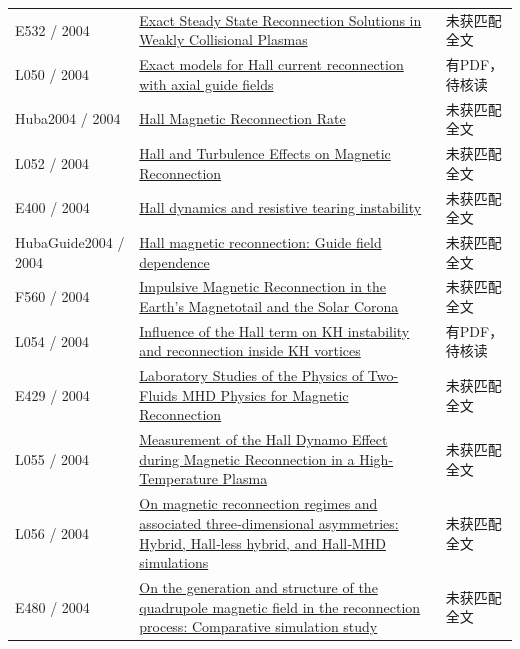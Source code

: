 \documentclass[UTF8,a4paper,11pt,openany,fontset=fandol]{ctexbook}
\begin{document}
\begin{longtable}{P{24mm}P{97mm}P{27mm}}
E532 / 2004 & \href{https://doi.org/10.1086/425646}{Exact Steady State Reconnection Solutions in Weakly Collisional Plasmas} & 未获匹配全文\\

L050 / 2004 & \href{https://doi.org/10.1063/1.1826094}{Exact models for Hall current reconnection with axial guide fields} & 有PDF，待核读\\

Huba2004 / 2004 & \href{https://doi.org/10.1103/physrevlett.93.175003}{Hall Magnetic Reconnection Rate} & 未获匹配全文\\

L052 / 2004 & \href{https://doi.org/10.1029/2003gl018689}{Hall and Turbulence Effects on Magnetic Reconnection} & 未获匹配全文\\

E400 / 2004 & \href{https://doi.org/10.1017/s0022377804002880}{Hall dynamics and resistive tearing instability} & 未获匹配全文\\

HubaGuide2004 / 2004 & \href{https://doi.org/10.1063/1.1834592}{Hall magnetic reconnection: Guide field dependence} & 未获匹配全文\\

F560 / 2004 & \href{https://doi.org/10.1146/annurev.astro.42.053102.134039}{Impulsive Magnetic Reconnection in the Earth's Magnetotail and the Solar Corona} & 未获匹配全文\\

L054 / 2004 & \href{https://doi.org/10.5194/angeo-22-935-2004}{Influence of the Hall term on KH instability and reconnection inside KH vortices} & 有PDF，待核读\\

E429 / 2004 & \href{http://ui.adsabs.harvard.edu/abs/2004AGUFMSM51D..07Y/abstract}{Laboratory Studies of the Physics of Two-Fluids MHD Physics for Magnetic Reconnection} & 未获匹配全文\\

L055 / 2004 & \href{https://doi.org/10.1103/physrevlett.93.045002}{Measurement of the Hall Dynamo Effect during Magnetic Reconnection in a High-Temperature Plasma} & 未获匹配全文\\

L056 / 2004 & \href{https://doi.org/10.1029/2004ja010478}{On magnetic reconnection regimes and associated three‐dimensional asymmetries: Hybrid,  Hall‐less hybrid,  and Hall‐MHD simulations} & 未获匹配全文\\

E480 / 2004 & \href{https://doi.org/10.1029/2004gl019553}{On the generation and structure of the quadrupole magnetic field in the reconnection process: Comparative simulation study} & 未获匹配全文\\


\end{longtable}
\end{document}
